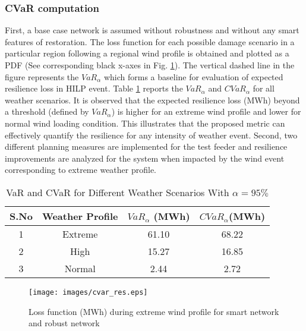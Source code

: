 \documentclass[12pt]{article}
\begin{document}
 \subsubsection{CVaR computation}
 \vspace{-0.1cm}
First, a base case network is assumed without robustness and without any smart features of restoration. The loss function for each possible damage scenario in a particular region following a regional wind profile is obtained and plotted as a PDF (See corresponding black x-axes in Fig. \ref{fig:8}). The vertical dashed line in the figure represents the $VaR_\alpha$ which forms a baseline for evaluation of expected resilience loss in HILP event. Table \ref{table:3} reports the $VaR_\alpha$ and $CVaR_\alpha$ for all weather scenarios. It is observed that the expected resilience loss (MWh) beyond a threshold (defined by $VaR_\alpha$) is higher for an extreme wind profile and lower for normal wind loading condition. This illustrates that the proposed metric can effectively quantify the resilience for any intensity of weather event. Second, two different planning measures are implemented for the test feeder and resilience improvements are analyzed for the system when impacted by the wind event corresponding to extreme weather profile. 
 \begin{table}[h]
        \vspace{-0.0 cm}
        \centering
        \caption{VaR and CVaR for Different Weather Scenarios With $\alpha =95\%$}
        \vspace{-0.1 cm}
        \label{table:3}
        \begin{tabular}{cccc}
            \toprule[0.3 mm]
            S.No&Weather Profile&$VaR_{\alpha}$ (MWh)&$CVaR_{\alpha}$(MWh)\\
            \hline
            1&Extreme &61.10&68.22 \\
            \hline
            2&High &15.27&16.85 \\
            \hline
            3&Normal&2.44&2.72 \\
            \toprule[0.3 mm]
        \end{tabular}
        \vspace{-0.2 cm}
    \end{table}
    
      \begin{figure}[t]%
    \centering
    \texttt{[image: images/cvar\_res.eps]} 
    \caption{Loss function (MWh) during extreme wind profile for smart network and robust network}
    \label{fig:8}
    \vspace{-0.5 cm}
\end{figure}
\end{document}
